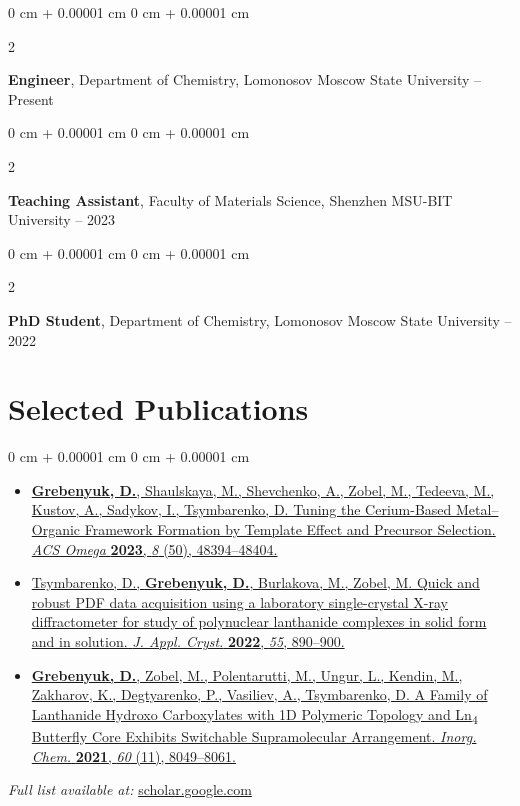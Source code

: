 \documentclass[10pt, letterpaper]{article}
\newenvironment{onecolentry}{
    \begin{adjustwidth}{
        0 cm + 0.00001 cm
    }{
        0 cm + 0.00001 cm
    }
}{
    \end{adjustwidth}
} %
\newenvironment{twocolentry}[2][]{
    \onecolentry
    \def\secondColumn{#2}
    \setcolumnwidth{\fill, 4.5 cm}
    \begin{paracol}{2}
}{
    \switchcolumn \raggedleft \secondColumn
    \end{paracol}
    \endonecolentry
} %
\begin{document}
        \vspace{0.05 cm}

        \begin{twocolentry}{
            2019 – Present
        }
            \textbf{Engineer}, Department of Chemistry, Lomonosov Moscow State University\end{twocolentry}

        \vspace{0.05 cm}

        \begin{twocolentry}{
            2019 – 2023
        }
            \textbf{Teaching Assistant}, Faculty of Materials Science, Shenzhen MSU-BIT University\end{twocolentry}

        \vspace{0.05 cm}

        \begin{twocolentry}{
            2018 – 2022
        }
            \textbf{PhD Student}, Department of Chemistry, Lomonosov Moscow State University\end{twocolentry}

\section{Selected Publications}
\vspace{0.10 cm}
\begin{onecolentry}
    \begin{itemize}
        \item \href{https://pubs.acs.org/doi/10.1021/acsomega.3c07906}{\textbf{Grebenyuk, D.}, Shaulskaya, M., Shevchenko, A., Zobel, M., Tedeeva, M., Kustov, A., Sadykov, I., Tsymbarenko, D.  
        Tuning the Cerium-Based Metal–Organic Framework Formation by Template Effect and Precursor Selection.  
        \textit{ACS Omega} \textbf{2023}, \textit{8} (50), 48394–48404.}

        \item \href{https://doi.org/10.1107/S1600576722005878}{Tsymbarenko, D., \textbf{Grebenyuk, D.}, Burlakova, M., Zobel, M.  
        Quick and robust PDF data acquisition using a laboratory single-crystal X-ray diffractometer for study of polynuclear lanthanide complexes in solid form and in solution.  
        \textit{J. Appl. Cryst.} \textbf{2022}, \textit{55}, 890–900.}

        \item \href{https://pubs.acs.org/doi/10.1021/acs.inorgchem.1c00581}{\textbf{Grebenyuk, D.}, Zobel, M., Polentarutti, M., Ungur, L., Kendin, M., Zakharov, K., Degtyarenko, P., Vasiliev, A., Tsymbarenko, D.  
        A Family of Lanthanide Hydroxo Carboxylates with 1D Polymeric Topology and Ln\textsubscript{4} Butterfly Core Exhibits Switchable Supramolecular Arrangement.  
        \textit{Inorg. Chem.} \textbf{2021}, \textit{60} (11), 8049–8061.}
    \end{itemize}
    \vspace{0.1cm}
    \textit{Full list available at:} \href{https://scholar.google.com/citations?user=pNWZLJoAAAAJ&hl=en}{scholar.google.com}
\end{onecolentry}
    
\end{document}
